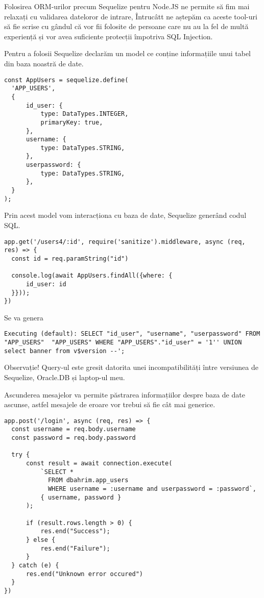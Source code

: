 \documentclass[12pt, a4paper]{report}
\begin{document}
Folosirea ORM-urilor precum Sequelize pentru Node.JS ne permite să fim mai 
relaxați cu validarea dateloror de intrare, Întrucâtt ne aștepăm ca aceste tool-uri să 
fie scrise cu gândul că vor fii folosite de persoane care nu au la fel de multă 
experiență și vor avea suficiente protecții împotriva SQL Injection.

Pentru a folosii Sequelize declarăm un model ce conține informațiile unui tabel din baza noastră de date.

\lstset{language=JavaScript}
\begin{lstlisting}
const AppUsers = sequelize.define(
  'APP_USERS',
  {
      id_user: {
          type: DataTypes.INTEGER,
          primaryKey: true,
      },
      username: {
          type: DataTypes.STRING,
      },
      userpassword: {
          type: DataTypes.STRING,
      },
  }
);
\end{lstlisting}

Prin acest model vom interacționa cu baza de date, Sequelize generând codul SQL.

\lstset{language=JavaScript}
\begin{lstlisting}
app.get('/users4/:id', require('sanitize').middleware, async (req, res) => {
  const id = req.paramString("id")

  console.log(await AppUsers.findAll({where: {
      id_user: id
  }}));
})
\end{lstlisting}

Se va genera

\lstset{language=JavaScript}
\begin{lstlisting}
Executing (default): SELECT "id_user", "username", "userpassword" FROM "APP_USERS"  "APP_USERS" WHERE "APP_USERS"."id_user" = '1'' UNION select banner from v$version --';
\end{lstlisting}

Observație! Query-ul este gresit datorita unei incompatibilități între versiunea de Sequelize, Oracle.DB și laptop-ul meu.

Ascunderea mesajelor va permite păstrarea informațiilor despre baza de date ascunse,
astfel mesajele de eroare vor trebui să fie cât mai generice.

\lstset{language=JavaScript}
\begin{lstlisting}
app.post('/login', async (req, res) => {
  const username = req.body.username
  const password = req.body.password

  try {
      const result = await connection.execute(
          `SELECT *
            FROM dbahrim.app_users
            WHERE username = :username and userpassword = :password`,
          { username, password }
      );

      if (result.rows.length > 0) {
          res.end("Success");
      } else {
          res.end("Failure");
      }
  } catch (e) {
      res.end("Unknown error occured")
  }
})
\end{lstlisting}
\end{document}

